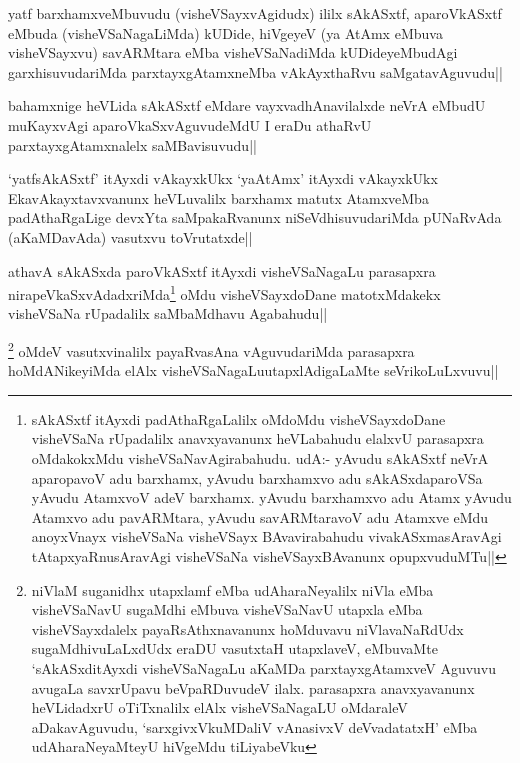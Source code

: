 \begin{artha}
yatf barxhamxveMbuvudu (visheVSayxvAgidudx) ililx sAkASxtf, aparoVkASxtf eMbuda (visheVSaNagaLiMda) kUDide, hiVgeyeV
(ya AtAmx eMbuva visheVSayxvu) savARMtara eMba visheVSaNadiMda kUDideyeMbudAgi garxhisuvudariMda parxtayxgAtamxneMba vAkAyxthaRvu saMgatavAguvudu|| 
\end{artha}


\begin{artha}
bahamxnige heVLida sAkASxtf eMdare vayxvadhAnavilalxde neVrA eMbudU muKayxvAgi aparoVkaSxvAguvudeMdU I eraDu athaRvU parxtayxgAtamxnalelx saMBavisuvudu||
\end{artha}%

\begin{artha}
`yatfsAkASxtf' itAyxdi vAkayxkUkx `yaAtAmx' itAyxdi vAkayxkUkx EkavAkayxtavxvanunx heVLuvalilx barxhamx 
matutx AtamxveMba padAthaRgaLige devxYta saMpakaRvanunx niSeVdhisuvudariMda pUNaRvAda (aKaMDavAda) vasutxvu 
toVrutatxde||
\end{artha}


\begin{artha}
athavA  sAkASxda paroVkASxtf itAyxdi visheVSaNagaLu parasapxra nirapeVkaSxvAdadxriMda\footnote[1]{sAkASxtf itAyxdi padAthaRgaLalilx oMdoMdu visheVSayxdoDane visheVSaNa rUpadalilx anavxyavanunx heVLabahudu elalxvU parasapxra oMdakokxMdu visheVSaNavAgirabahudu. udA:- yAvudu sAkASxtf neVrA aparopavoV adu barxhamx, yAvudu barxhamxvo adu sAkASxdaparoVSa yAvudu AtamxvoV adeV barxhamx. yAvudu barxhamxvo adu Atamx yAvudu Atamxvo adu pavARMtara, yAvudu savARMtaravoV adu Atamxve eMdu anoyxVnayx visheVSaNa visheVSayx BAvavirabahudu vivakASxmasAravAgi tAtapxyaRnusAravAgi visheVSaNa visheVSayxBAvanunx opupxvuduMTu||} oMdu visheVSayxdoDane matotxMdakekx visheVSaNa rUpadalilx saMbaMdhavu Agabahudu||
\end{artha}


\begin{artha}
\footnote[2]{niVlaM suganidhx utapxlamf eMba udAharaNeyalilx niVla eMba visheVSaNavU sugaMdhi eMbuva visheVSaNavU utapxla eMba
visheVSayxdalelx payaRsAthxnavanunx hoMduvavu niVlavaNaRdUdx sugaMdhivuLaLxdUdx eraDU vasutxtaH utapxlaveV, eMbuvaMte `sAkASxditAyxdi visheVSaNagaLu aKaMDa parxtayxgAtamxveV Aguvuvu avugaLa savxrUpavu beVpaRDuvudeV ilalx. parasapxra anavxyavanunx heVLidadxrU oTiTxnalilx elAlx visheVSaNagaLU oMdaraleV aDakavAguvudu, `sarxgivxVkuMDaliV vAnasivxV deVvadatatxH' eMba udAharaNeyaMteyU hiVgeMdu tiLiyabeVku} oMdeV vasutxvinalilx payaRvasAna vAguvudariMda parasapxra hoMdANikeyiMda elAlx visheVSaNagaLu\footnotemark[2]utapxlAdigaLaMte seVrikoLuLxvuvu||
\end{artha}

